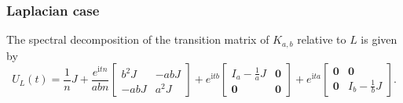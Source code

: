 \documentclass{article}
\numberwithin{equation}{section}
\newcommand{\zero}{\mathbf 0}
\def\ii{\mathrm{i}}
\begin{document}
{\subsubsection{Laplacian case}

The spectral decomposition of the transition matrix of $K_{a,b}$ relative to $L$ is given by
\begin{equation}
\label{Eq:completebipL}
U_{L}(t)=\frac{1}{n}J+\frac{e^{\ii tn}}{abn}\left[\begin{array}{cc} b^2J&-abJ \\ -abJ&a^2J\end{array} \right]+e^{\ii tb}\left[\begin{array}{cc} I_a-\frac{1}{a}J&\zero \\ \zero&\zero\end{array} \right]+e^{\ii ta}\left[\begin{array}{cc} \zero&\zero \\ \zero&I_b-\frac{1}{b}J\end{array} \right].
\end{equation}

}
\end{document}
